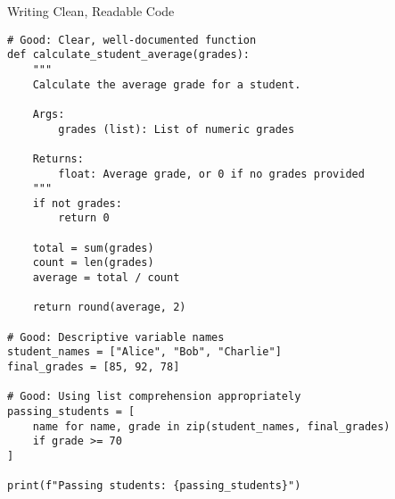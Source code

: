 \begin{frame}[fragile]{Writing Clean, Readable Code}
    \begin{codeblock}
        \begin{lstlisting}
# Good: Clear, well-documented function
def calculate_student_average(grades):
    """
    Calculate the average grade for a student.
    
    Args:
        grades (list): List of numeric grades
        
    Returns:
        float: Average grade, or 0 if no grades provided
    """
    if not grades:
        return 0
    
    total = sum(grades)
    count = len(grades)
    average = total / count
    
    return round(average, 2)

# Good: Descriptive variable names
student_names = ["Alice", "Bob", "Charlie"]
final_grades = [85, 92, 78]

# Good: Using list comprehension appropriately
passing_students = [
    name for name, grade in zip(student_names, final_grades) 
    if grade >= 70
]

print(f"Passing students: {passing_students}")
        \end{lstlisting}
    \end{codeblock}
\end{frame}
